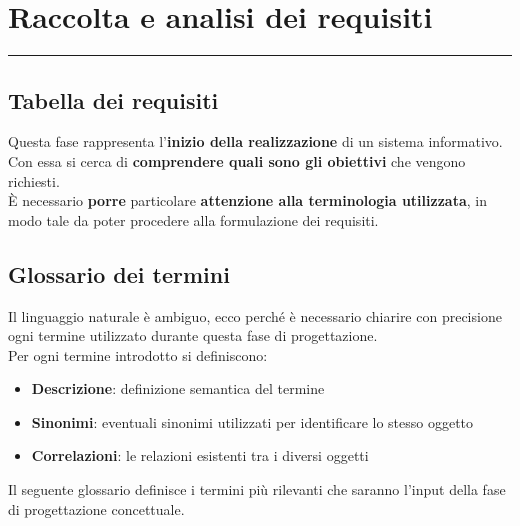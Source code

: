 \documentclass[legalpaper]{article}
\begin{document}
\newpage
\section{Raccolta e analisi dei requisiti}
\rule{\linewidth}{1.5pt}
\subsection{Tabella dei requisiti}
Questa fase rappresenta l’\textbf{inizio della realizzazione} di un sistema informativo.
Con essa si cerca di \textbf{comprendere quali sono gli obiettivi} che vengono richiesti.\\ 
È necessario \textbf{porre} particolare \textbf{attenzione alla terminologia utilizzata}, in modo tale da poter procedere alla formulazione dei requisiti.

\subsection{Glossario dei termini}
Il linguaggio naturale è ambiguo, ecco perché è necessario chiarire con precisione ogni termine utilizzato durante questa fase di progettazione.\\
Per ogni termine introdotto si definiscono:
\begin{itemize}
    \item \textbf{Descrizione}: definizione semantica del termine
    \item \textbf{Sinonimi}: eventuali sinonimi utilizzati per identificare lo stesso oggetto
    \item \textbf{Correlazioni}: le relazioni esistenti tra i diversi oggetti
\end{itemize}
\medskip
Il seguente glossario definisce i termini più rilevanti che saranno l’input della fase di progettazione concettuale.\\ \newline
\medskip
\renewcommand\arraystretch{1,5}
\end{document}
